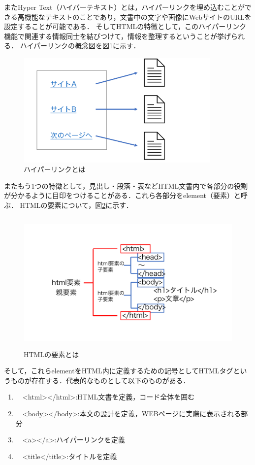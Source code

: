 \documentclass[12pt,a4j]{ltjsarticle}
\begin{document}
またHyper Text（ハイパーテキスト）とは，ハイパーリンクを埋め込むことができる高機能なテキストのことであり，文書中の文字や画像にWebサイトのURLを設定することが可能である．
そしてHTMLの特徴として，このハイパーリンク機能で関連する情報同士を結びつけて，情報を整理するということが挙げられる．
ハイパーリンクの概念図を図\ref{fig:hyper}に示す．
\begin{figure}[h]
\begin{center}
\includegraphics[width = 100mm ] {figures/hyperlink.pdf}
\caption{ハイパーリンクとは}
\label{fig:hyper}
\end{center}
\end{figure}


またもう1つの特徴として，見出し・段落・表などHTML文書内で各部分の役割が分かるように目印をつけることがある．これら各部分をelement（要素）と呼ぶ．
HTMLの要素について，図\ref{fig:html_elem}に示す．
\begin{figure}[h]
\begin{center}
\includegraphics[height = 70mm ] {figures/html_ele.pdf}
\caption{HTMLの要素とは}
\label{fig:html_elem}
\end{center}
\end{figure}

\clearpage

そして，これらelementをHTML内に定義するための記号としてHTMLタグというものが存在する．代表的なものとして以下のものがある．
\begin{enumerate}[label=(\roman*)]
	\item　<html></html>:HTML文書を定義，コード全体を囲む
	\item　<body></body>:本文の設計を定義，WEBページに実際に表示される部分
	\item　<a></a>:ハイパーリンクを定義
	\item　<title</title>:タイトルを定義
\end{enumerate}
\end{document}
